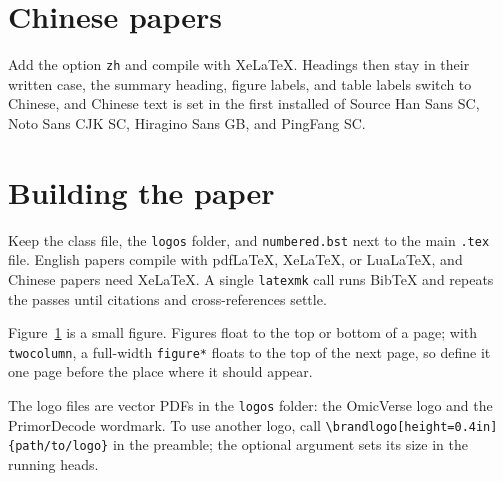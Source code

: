 \section{Chinese papers}

Add the option \texttt{zh} and compile with XeLaTeX. Headings then stay in their written case, the summary heading, figure labels, and table labels switch to Chinese, and Chinese text is set in the first installed of Source Han Sans SC, Noto Sans CJK SC, Hiragino Sans GB, and PingFang SC.

\section{Building the paper}

Keep the class file, the \texttt{logos} folder, and \texttt{numbered.bst} next to the main \texttt{.tex} file. English papers compile with pdfLaTeX, XeLaTeX, or LuaLaTeX, and Chinese papers need XeLaTeX. A single \texttt{latexmk} call runs BibTeX and repeats the passes until citations and cross-references settle.

\begin{figure}[t]
\centering
{}
\label{fig:build}
\end{figure}

Figure~\ref{fig:build} is a small figure. Figures float to the top or bottom of a page; with \texttt{twocolumn}, a full-width \texttt{figure*} floats to the top of the next page, so define it one page before the place where it should appear.

The logo files are vector PDFs in the \texttt{logos} folder: the OmicVerse logo and the PrimorDecode wordmark. To use another logo, call \texttt{\textbackslash brandlogo[height=0.4in]\{path/to/logo\}} in the preamble; the optional argument sets its size in the running heads.

